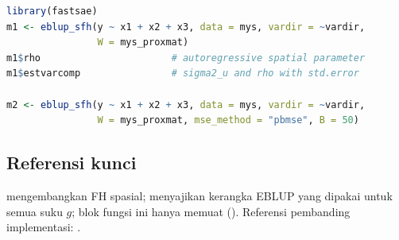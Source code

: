 \begin{lstlisting}[language=R,caption={Contoh yang dapat dijalankan (dari \texttt{man/eblup\_sfh.Rd}).}]
library(fastsae)
m1 <- eblup_sfh(y ~ x1 + x2 + x3, data = mys, vardir = ~vardir,
                W = mys_proxmat)
m1$rho                       # autoregressive spatial parameter
m1$estvarcomp                # sigma2_u and rho with std.error

m2 <- eblup_sfh(y ~ x1 + x2 + x3, data = mys, vardir = ~vardir,
                W = mys_proxmat, mse_method = "pbmse", B = 50)
\end{lstlisting}

\subsection{Referensi kunci}\label{sec:sfh-ref}

\citet{pratesi2008small} mengembangkan FH spasial; \citet{rao2015small}
menyajikan kerangka EBLUP yang dipakai untuk semua suku $g$;
blok  fungsi ini hanya memuat \citet{rao2015small}
(). Referensi pembanding implementasi:
 \citep{molina2015sae}.
